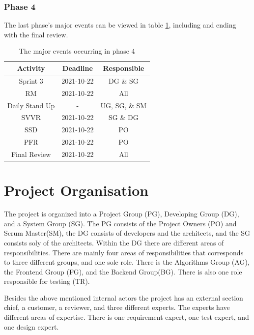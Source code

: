 \documentclass{article}
\begin{document}
\subsubsection{Phase 4}
The last phase's major events can be viewed in table \ref{tab:phase4}, including and ending with the final review. 
\begin{table}[H]
    \centering
    \begin{tabular}{|c|c|c|}
    \hline
        Activity & Deadline & Responsible \\
        \hline \hline
        Sprint 3 & 2021-10-22 & DG \& SG \\
        \hline
        RM & 2021-10-22 & All \\
        \hline
        Daily Stand Up & - & UG, SG, \& SM \\
        \hline
        SVVR & 2021-10-22 & SG \& DG \\
        \hline
        SSD & 2021-10-22 & PO \\
        \hline
        PFR & 2021-10-22 & PO \\
        \hline
        Final Review & 2021-10-22 & All \\
        \hline
    \end{tabular}
    \caption{The major events occurring in phase 4}
    \label{tab:phase4}
\end{table}

\section{Project Organisation}
The project is organized into a Project Group (PG), Developing Group (DG), and a System Group (SG). The PG consists of the Project Owners (PO) and Scrum Master(SM), the DG consists of developers and the architects, and the SG consists soly of the architects. Within the DG there are different areas of responsibilities. There are mainly four areas of responsibilities that corresponds to three different groups, and one sole role. There is the Algorithms Group (AG), the Frontend Group (FG), and the Backend Group(BG). There is also one role responsible for testing (TR). 

Besides the above mentioned internal actors the project has an external section chief, a customer, a reviewer, and three different experts. The experts have different areas of expertise. There is one requirement expert, one test expert, and one design expert.
\end{document}
